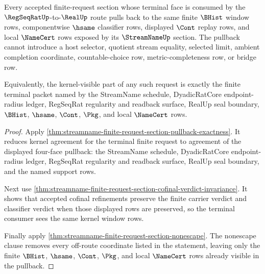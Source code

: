 \begin{theorem}
\label{thm:streamname-finite-request-section-kernel-pullback}
Every accepted finite-request section whose terminal face is consumed by the
$\RegSeqRatUp$-to-$\RealUp$ route pulls back to the same finite $\BHist$
window rows, componentwise $\hsame$ classifier rows, displayed $\Cont$ replay
rows, and local $\NameCert$ rows exposed by its $\StreamNameUp$ section. The
pullback cannot introduce a host selector, quotient stream equality, selected
limit, ambient completion coordinate, countable-choice row, metric-completeness
row, or bridge row.

Equivalently, the kernel-visible part of any such request is exactly the
finite terminal packet named by the StreamName schedule, DyadicRatCore
endpoint-radius ledger, RegSeqRat regularity and readback surface, RealUp seal
boundary, $\BHist$, $\hsame$, $\Cont$, $\Pkg$, and local $\NameCert$ rows.
\end{theorem}
\begin{proof}
Apply
\autoref{thm:streamname-finite-request-section-pullback-exactness}. It reduces
kernel agreement for the terminal finite request to agreement of the displayed
four-face pullback: the StreamName schedule, DyadicRatCore endpoint-radius
ledger, RegSeqRat regularity and readback surface, RealUp seal boundary, and
the named support rows.

Next use
\autoref{thm:streamname-finite-request-section-cofinal-verdict-invariance}.
It shows that accepted cofinal refinements preserve the finite carrier verdict
and classifier verdict when those displayed rows are preserved, so the
terminal consumer sees the same kernel window rows.

Finally apply \autoref{thm:streamname-finite-request-section-nonescape}. The
nonescape clause removes every off-route coordinate listed in the statement,
leaving only the finite $\BHist$, $\hsame$, $\Cont$, $\Pkg$, and local
$\NameCert$ rows already visible in the pullback.
\end{proof}

